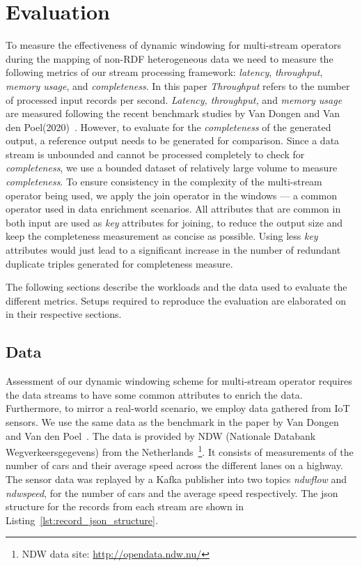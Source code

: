 \chapter{Evaluation}
\label{chap:Evaluation}

To measure the effectiveness of dynamic windowing for multi-stream operators during the 
mapping of non-RDF heterogeneous data we need to measure the following 
metrics of our stream processing framework: \emph{latency}, \emph{throughput},
\emph{memory usage}, and \emph{completeness}. In this paper \emph{Throughput} refers to the number of processed input records per second.
\emph{Latency, throughput,} and \emph{memory usage} are measured following the recent benchmark studies by 
Van Dongen and Van den Poel(2020)~\cite{evalution_of_spe}. 
However, to evaluate 
for the \emph{completeness}
of the generated output, a reference output needs 
to be generated for comparison. Since a data stream is unbounded and cannot be processed completely to check for \emph{completeness}, we use a bounded 
dataset of relatively large volume to measure \emph{completeness}.
To ensure consistency in the complexity of the multi-stream operator being used, 
we apply the join operator in the windows --- a common operator used in 
data enrichment scenarios. All attributes that are common in both 
input are used as \emph{key} attributes for joining, 
to reduce the output size and keep the completeness measurement as concise 
as possible. Using less \emph{key} attributes would just lead to a significant increase 
in the number of redundant duplicate triples generated for completeness measure. 

The following sections describe the workloads and the data used to evaluate the
different metrics. Setups required to reproduce the evaluation are elaborated on
in their respective sections. 


\section{Data}

Assessment of our dynamic windowing scheme for multi-stream operator requires 
the data streams to have some common attributes to enrich the data. Furthermore, to 
mirror a real-world scenario, we employ data gathered from IoT sensors. 
We use the same data 
as the benchmark in the paper by Van Dongen and Van den Poel~\cite{evalution_of_spe}. 
The data is provided by NDW (Nationale Databank Wegverkeersgegevens) from the 
Netherlands~\footnote{NDW data site: \href{http://opendata.ndw.nu/}{http://opendata.ndw.nu/} }.
It consists of measurements of the number of cars and their average speed across the different 
lanes on a highway. 
The sensor data was replayed by a Kafka publisher into two topics 
\emph{ndwflow} and \emph{ndwspeed}, for the number of cars and the average speed respectively. The json 
structure for the records from each stream are shown in Listing~\ref{lst:record_json_structure}. 

